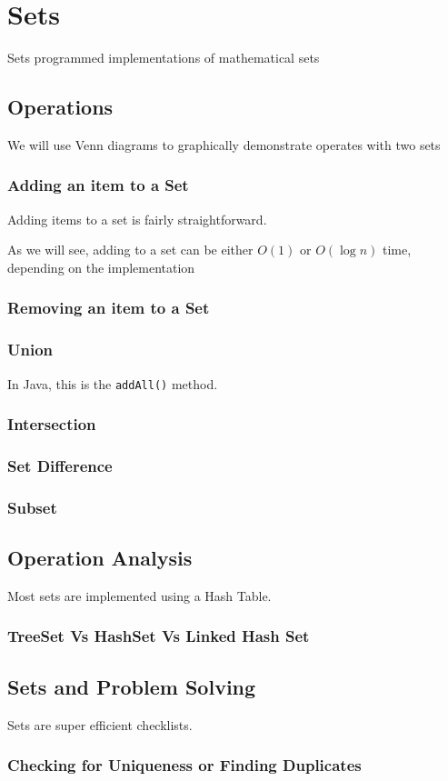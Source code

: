 \chapter{Sets}
\label{chap-sets}
Sets programmed  implementations of mathematical sets




\section{Operations}

We will use Venn diagrams to graphically  demonstrate operates with two sets
\subsection{Adding an item to a Set}

Adding items to a set is fairly straightforward.




As we will see, adding to a set can be either $O(1)$ or $O(\log n)$ time, depending on the implementation

\subsection{Removing an item to a Set}


\subsection{Union}
In Java, this is the \texttt{addAll()} method.


\subsection{Intersection}


\subsection{Set Difference}

\subsection{Subset}

\section{Operation Analysis}

Most sets are implemented using a Hash Table.

\subsection{TreeSet Vs HashSet Vs Linked Hash Set}

\section{Sets and Problem Solving}

Sets are super efficient checklists.

\subsection{Checking for Uniqueness or Finding Duplicates}
